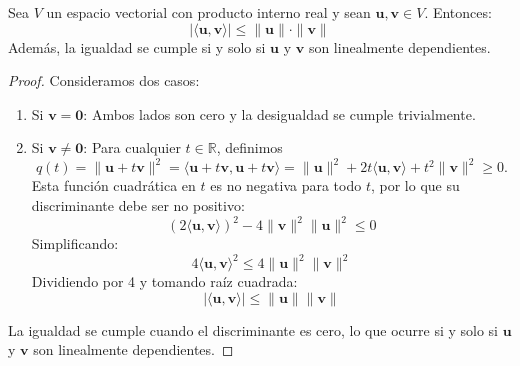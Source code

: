 \begin{theorem}
Sea $V$ un espacio vectorial con producto interno real y sean $\mathbf{u}, \mathbf{v} \in V$. Entonces:
\[
|\langle \mathbf{u}, \mathbf{v} \rangle| \leq \|\mathbf{u}\| \cdot \|\mathbf{v}\|
\]
Además, la igualdad se cumple si y solo si $\mathbf{u}$ y $\mathbf{v}$ son linealmente dependientes.
\begin{proof}
Consideramos dos casos:
\begin{enumerate}
    \item Si $\mathbf{v} = \mathbf{0}$: Ambos lados son cero y la desigualdad se cumple trivialmente.
    
    \item Si $\mathbf{v} \neq \mathbf{0}$: Para cualquier $t \in \mathbb{R}$, definimos \[q(t) = \|\mathbf{u} + t\mathbf{v}\|^2 = \langle \mathbf{u} + t\mathbf{v}, \mathbf{u} + t\mathbf{v} \rangle = \|\mathbf{u}\|^2 + 2t\langle \mathbf{u}, \mathbf{v} \rangle + t^2\|\mathbf{v}\|^2 \geq 0.\]
    Esta función cuadrática en $t$ es no negativa para todo $t$, por lo que su discriminante debe ser no positivo:
    \[
    (2\langle \mathbf{u}, \mathbf{v} \rangle)^2 - 4\|\mathbf{v}\|^2\|\mathbf{u}\|^2 \leq 0
    \]
    Simplificando:
    \[
    4\langle \mathbf{u}, \mathbf{v} \rangle^2 \leq 4\|\mathbf{u}\|^2\|\mathbf{v}\|^2
    \]
    Dividiendo por 4 y tomando raíz cuadrada:
    \[
    |\langle \mathbf{u}, \mathbf{v} \rangle| \leq \|\mathbf{u}\|\|\mathbf{v}\|
    \]
\end{enumerate}
La igualdad se cumple cuando el discriminante es cero, lo que ocurre si y solo si $\mathbf{u}$ y $\mathbf{v}$ son linealmente dependientes.
\end{proof}
\end{theorem}

